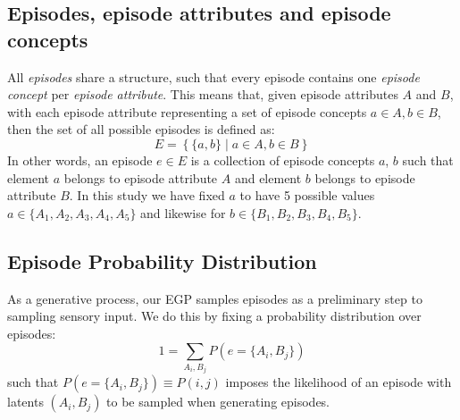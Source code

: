 \documentclass{article}
\begin{document}
\subsection*{Episodes, episode attributes and episode concepts}
All \textit{episodes} share a structure, such that every episode contains one \textit{episode concept} per \textit{episode attribute}. This means that, given episode attributes $A$ and $B$, with each episode attribute representing a set of episode concepts $a\in A, b\in B$, then the set of all possible episodes is defined as:
\begin{equation}
    E = \left\{ \{a, b\} \mid a \in A, b \in B \right\}
\end{equation}
In other words, an episode $e\in E$ is a collection of episode concepts $a$, $b$ such that element $a$ belongs to episode attribute  $A$ and element $b$ belongs to episode attribute $B$. In this study we have fixed $a$ to have 5 possible values $a\in \{A_1, A_2, A_3, A_4, A_5\}$ and likewise for $b\in \{B_1, B_2, B_3, B_4, B_5\}$.
\newline\newline
\subsection*{Episode Probability Distribution}
As a generative process, our EGP samples episodes as a preliminary step to sampling sensory input. We do this by fixing a probability distribution over episodes:
\begin{equation}
    1 = \sum_{A_i, B_j}P(e = \{A_i, B_j\}) 
\end{equation}
such that $P(e = \{A_i, B_j\}) \equiv P(i,j)$ imposes the likelihood of an episode with latents $(A_i, B_j)$ to be sampled when generating episodes.
\end{document}
